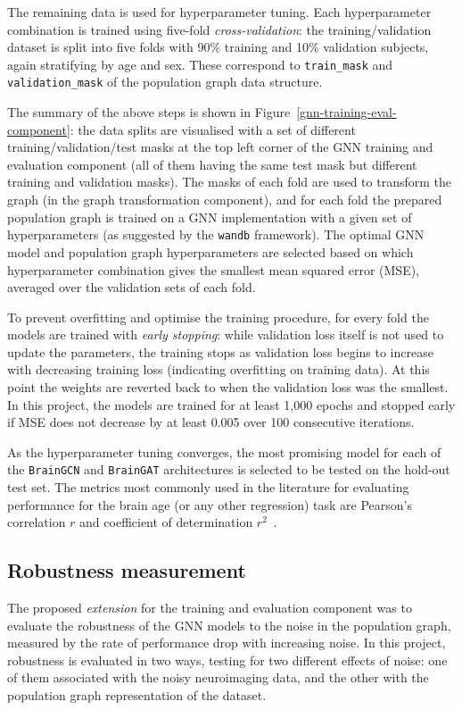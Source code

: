 The remaining data is used for hyperparameter tuning. Each hyperparameter combination is trained using five-fold \textit{cross-validation}: the training/validation dataset is split into five folds with 90\% training and 10\% validation subjects, again stratifying by age and sex. These correspond to \texttt{train\_mask} and \texttt{validation\_mask} of the population graph data structure. 

The summary of the above steps is shown in Figure~\ref{gnn-training-eval-component}: the data splits are visualised with a set of different training/validation/test masks at the top left corner of the GNN training and evaluation component (all of them having the same test mask but different training and validation masks). The masks of each fold are used to transform the graph (in the graph transformation component), and for each fold the prepared population graph is trained on a GNN implementation with a given set of hyperparameters (as suggested by the \texttt{wandb} framework). The optimal GNN model and population graph hyperparameters are selected based on which hyperparameter combination gives the smallest mean squared error (MSE), averaged over the validation sets of each fold.

To prevent overfitting and optimise the training procedure, for every fold the models are trained with \textit{early stopping}: while validation loss itself is not used to update the parameters, the training stops as validation loss begins to increase with decreasing training loss (indicating overfitting on training data). At this point the weights are reverted back to when the validation loss was the smallest. In this project, the models are trained for at least 1,000 epochs and stopped early if MSE does not decrease by at least 0.005 over 100 consecutive iterations. 

As the hyperparameter tuning converges, the most promising model for each of the \texttt{BrainGCN} and \texttt{BrainGAT} architectures is selected to be tested on the hold-out test set. The metrics most commonly used in the literature for evaluating performance for the brain age (or any other regression) task are Pearson's correlation $r$ and coefficient of determination $r^2$~\cite{pervaiz2020optimising, niu2019improved}.

\subsection{Robustness measurement}
The proposed \textit{extension} for the training and evaluation component was to evaluate the robustness of the GNN models to the noise in the population graph, measured by the rate of performance drop with increasing noise. In this project, robustness is evaluated in two ways, testing for two different effects of noise: one of them associated with the noisy neuroimaging data, and the other with the population graph representation of the dataset.

